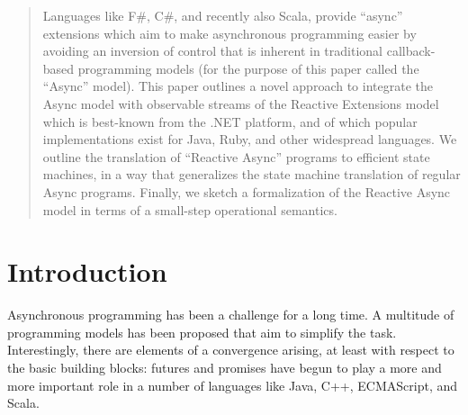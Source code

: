 \documentclass{acm_proc_article-sp}
\begin{document}
\maketitle
\begin{abstract}

Languages like F\#, C\#, and recently also Scala, provide ``async'' extensions
which aim to make asynchronous programming easier by avoiding an inversion of
control that is inherent in traditional callback-based programming models (for
the purpose of this paper called the ``Async'' model). This paper outlines a
novel approach to integrate the Async model with observable streams of the
Reactive Extensions model which is best-known from the .NET platform, and of
which popular implementations exist for Java, Ruby, and other widespread
languages. We outline the translation of ``Reactive Async'' programs to
efficient state machines, in a way that generalizes the state machine
translation of regular Async programs. Finally, we sketch a formalization of
the Reactive Async model in terms of a small-step operational semantics.

\end{abstract}




\section{Introduction}

Asynchronous programming has been a challenge for a long time. A multitude of
programming models has been proposed that aim to simplify the task.
Interestingly, there are elements of a convergence arising, at least with
respect to the basic building blocks: futures and promises have begun to play
a more and more important role in a number of languages like Java, C++,
ECMAScript, and Scala.
\end{document}
